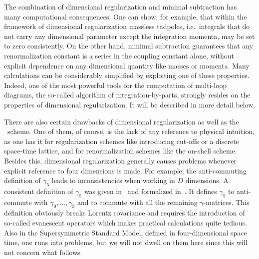 The combination of dimensional regularization and minimal subtraction
has many computational consequences. One can show, for example, that within
the framework of dimensional regularization massless tadpoles,
i.e.~integrals that do not carry any dimensional parameter except the
integration momenta, may be set to zero consistently. On the other hand,
minimal subtraction guarantees that any renormalization constant is a
series in the coupling constant alone, without explicit dependence on
any dimensional quantity like masses or momenta.  Many calculations can
be considerably simplified by exploiting one of these properties.
Indeed, one of the most powerful tools for the computation of multi-loop
diagrams, the so-called algorithm of integration-by-parts,
strongly resides on the properties of dimensional regularization. It
will be described in more detail below.

There are also certain drawbacks of dimensional regularization as well
as the \msbar~scheme.  One of them, of course, is the lack of any
reference to physical intuition, as one has it for regularization
schemes like introducing cut-offs or a discrete space-time lattice, and
for renormalization schemes like the on-shell scheme.  Besides this,
dimensional regularization generally causes problems whenever explicit
reference to four dimensions is made. For example, the anti-commuting
definition of $\gamma_5$ leads to inconsistencies when working in $D$
dimensions.  A consistent definition of $\gamma_5$ was given
in~\cite{tHoVel72} and formalized in~\cite{BreMai77}. It defines
$\gamma_5$ to anti-commute with $\gamma_0,\ldots,\gamma_3$ and to
commute with all the remaining $\gamma$-matrices. This definition
obviously breaks Lorentz covariance and requires the introduction of so-called
evanescent operators which makes practical calculations quite tedious.
Also in the Supersymmetric Standard
Model, defined in four-dimensional space time, one runs into problems,
but we will not dwell on them here since this will not concern what
follows.


